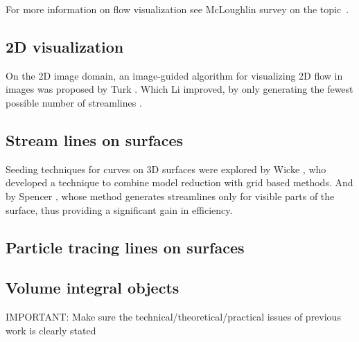For more information on flow visualization see McLoughlin survey on the topic~\cite{McLoughlin2010}.

\subsection{2D visualization}

On the 2D image domain, an image-guided algorithm for visualizing 2D flow in images was proposed by Turk \cite{Turk1996}.
Which Li improved, by only generating the fewest possible number of streamlines \cite{Li2008}. 

\subsection{Stream lines on surfaces}

Seeding techniques for curves on 3D surfaces were explored by Wicke \cite{Wicke2009}, who developed a technique to combine model reduction with grid based methods.
And by Spencer \cite{Spencer2009}, whose method generates streamlines only for visible parts of the surface, thus providing a significant gain in efficiency.

\subsection{Particle tracing lines on surfaces}

\subsection{Volume integral objects}


IMPORTANT: Make sure the technical/theoretical/practical issues of previous work is clearly stated 